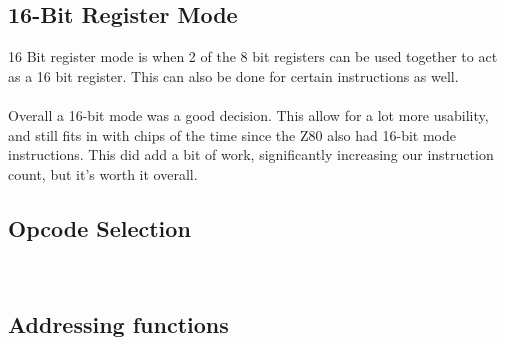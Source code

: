 \documentclass[conference]{IEEEtran}
\begin{document}
\subsection{16-Bit Register Mode}
16 Bit register mode is when 2 of the 8 bit registers can be used together to act as a 16 bit register. This can also be done for certain instructions as well.\\

\\

Overall a 16-bit mode was a good decision. This allow for a lot more usability, and still fits in with chips of the time since the Z80 also had 16-bit mode instructions. This did add a bit of work, significantly increasing our instruction count,  but it's worth it overall.

\subsection{Opcode Selection}

\\

\subsection{Addressing functions}
\end{document}
